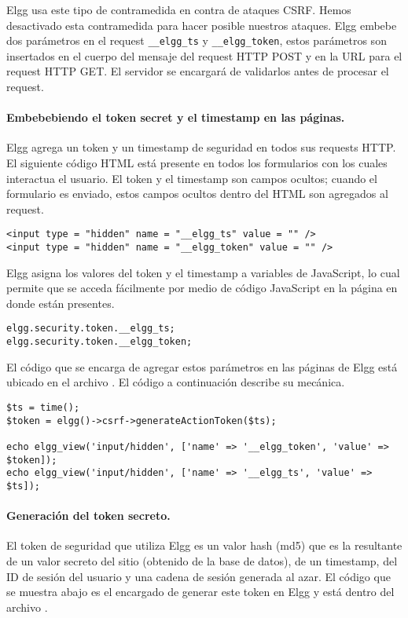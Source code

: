 Elgg usa este tipo de contramedida en contra de ataques CSRF.
Hemos desactivado esta contramedida para hacer posible nuestros ataques.
Elgg embebe dos parámetros en el request {\tt\_\_elgg\_ts} y {\tt\_\_elgg\_token}, estos parámetros son insertados en el cuerpo del mensaje del request HTTP POST y en la URL para el request HTTP GET. El servidor se encargará de validarlos antes de procesar el request.


\paragraph{Embebebiendo el token secret y el timestamp en las páginas.}
Elgg agrega un token y un timestamp de seguridad en todos sus requests HTTP.
El siguiente código HTML está presente en todos los formularios con los cuales interactua el usuario.
El token y el timestamp son campos ocultos; cuando el formulario es enviado, estos campos ocultos dentro del HTML son agregados al request.

\begin{lstlisting}
<input type = "hidden" name = "__elgg_ts" value = "" />
<input type = "hidden" name = "__elgg_token" value = "" />
\end{lstlisting}

Elgg asigna los valores del token y el timestamp a variables de JavaScript, lo cual permite que se acceda fácilmente por medio de código JavaScript en la página en donde están presentes.

\begin{lstlisting}
elgg.security.token.__elgg_ts;
elgg.security.token.__elgg_token;
\end{lstlisting}

El código que se encarga de agregar estos parámetros en las páginas de Elgg está ubicado en el archivo . El código a continuación describe su mecánica.

\begin{lstlisting}
$ts = time();
$token = elgg()->csrf->generateActionToken($ts);

echo elgg_view('input/hidden', ['name' => '__elgg_token', 'value' => $token]);
echo elgg_view('input/hidden', ['name' => '__elgg_ts', 'value' => $ts]);
\end{lstlisting}


\paragraph{Generación del token secreto.}
El token de seguridad que utiliza Elgg es un valor hash (md5) que es la resultante de un valor secreto del sitio (obtenido de la base de datos), de un timestamp, del ID de sesión del usuario y una cadena de sesión generada al azar.
El código que se muestra abajo es el encargado de generar este token en Elgg y está dentro del archivo .

